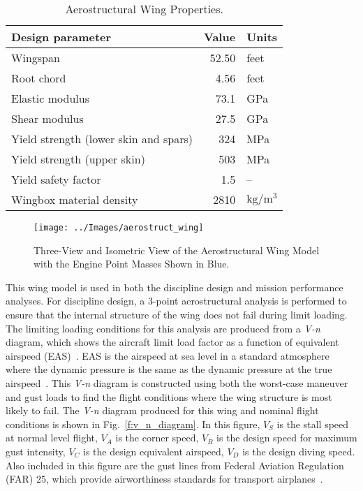\begin{table}[!htb]
 \normalsize
 \begin{center}
  \caption{Aerostructural Wing Properties.}
  \label{t:aerostruct_wing}
    \begin{tabular}{ l r l }
        \hline
        \textbf{Design parameter} & \textbf{Value} & \textbf{Units} \\
        \hline
        Wingspan & 52.50 & feet \\
        Root chord & 4.56 & feet \\
        Elastic modulus & 73.1 & GPa \\
        Shear modulus & 27.5 & GPa \\
        Yield strength (lower skin and spars) & 324 & MPa \\
        Yield strength (upper skin) & 503 & MPa \\
        Yield safety factor & 1.5 & -- \\
        Wingbox material density & 2810 & $\text{kg}/\text{m}^3$ \\
        \hline
    \end{tabular}
 \end{center}
\end{table}

\begin{figure}[h]
\begin{center}
 \texttt{[image: ../Images/aerostruct\_wing]}
 \caption{Three-View and Isometric View of the Aerostructural Wing Model with the Engine Point Masses Shown in Blue.}
 \label{f:OAS_wing}
\end{center}
\end{figure}

This wing model is used in both the discipline design and mission performance analyses.
For discipline design, a 3-point aerostructural analysis is performed to ensure that the internal structure of the wing does not fail during limit loading.
The limiting loading conditions for this analysis are produced from a \textit{V-n} diagram, which shows the aircraft limit load factor as a function of equivalent airspeed (EAS)~\cite{Raymer2012}.
EAS is the airspeed at sea level in a standard atmosphere where the dynamic pressure is the same as the dynamic pressure at the true airspeed~\cite{Raymer2012}.
This \textit{V-n} diagram is constructed using both the worst-case maneuver and gust loads to find the flight conditions where the wing structure is most likely to fail.
The \textit{V-n} diagram produced for this wing and nominal flight conditions is shown in Fig.~\ref{f:v_n_diagram}.
In this figure, $V_S$ is the stall speed at normal level flight, $V_A$ is the corner speed, $V_B$ is the design speed for maximum gust intensity, $V_C$ is the design equivalent airspeed, $V_D$ is the design diving speed.
Also included in this figure are the gust lines from Federal Aviation Regulation (FAR) 25, which provide airworthiness standards for transport airplanes~\cite{far25}.

